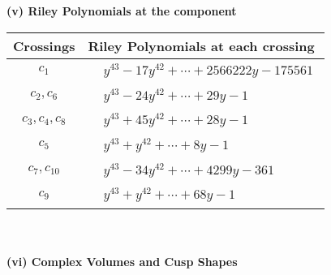 \documentclass[1p]{elsarticle_modified}
\theoremstyle{definition}
\begin{document}
\newpage\renewcommand{\arraystretch}{1}
\flushleft \textbf{(v) Riley Polynomials at the component}\newline \\
\begin{tabular}{m{50pt}|m{274pt}}
Crossings & \hspace{64pt}Riley Polynomials at each crossing \\
\hline $$\begin{aligned}c_{1}\end{aligned}$$&$\begin{aligned}
&y^{43}-17 y^{42}+\cdots+2566222 y-175561
\end{aligned}$\\
\hline $$\begin{aligned}c_{2},c_{6}\end{aligned}$$&$\begin{aligned}
&y^{43}-24 y^{42}+\cdots+29 y-1
\end{aligned}$\\
\hline $$\begin{aligned}c_{3},c_{4},c_{8}\end{aligned}$$&$\begin{aligned}
&y^{43}+45 y^{42}+\cdots+28 y-1
\end{aligned}$\\
\hline $$\begin{aligned}c_{5}\end{aligned}$$&$\begin{aligned}
&y^{43}+y^{42}+\cdots+8 y-1
\end{aligned}$\\
\hline $$\begin{aligned}c_{7},c_{10}\end{aligned}$$&$\begin{aligned}
&y^{43}-34 y^{42}+\cdots+4299 y-361
\end{aligned}$\\
\hline $$\begin{aligned}c_{9}\end{aligned}$$&$\begin{aligned}
&y^{43}+y^{42}+\cdots+68 y-1
\end{aligned}$\\
\hline
\end{tabular}\\~\\
\newpage\flushleft \textbf{(vi) Complex Volumes and Cusp Shapes}
\end{document}
